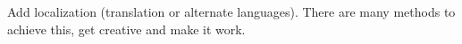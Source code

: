 \documentclass[12pt]{report}
\begin{document}


\vspace{\baselineskip}
Add localization (translation or alternate languages). There are many methods to achieve this, get creative and make it work. \par


\vspace{\baselineskip}

\vspace{\baselineskip}

\printbibliography
\end{document}
